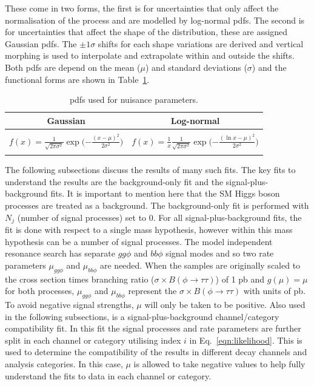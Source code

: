 These come in two forms, the first is for uncertainties that only affect the normalisation of the process and are modelled by log-normal pdfs. 
The second is for uncertainties that affect the shape of the distribution, these are assigned Gaussian pdfs.
The $\pm1\sigma$ shifts for each shape variations are derived and vertical morphing \cite{Conway:2011in} is used to interpolate and extrapolate within and outside the shifts.
Both pdfs are depend on the mean ($\mu$) and standard deviations ($\sigma$) and the functional forms are shown in Table~\ref{tab:pdfs}. \\

\begin{table}[!hbtp]
    \centering
    \begin{tabular}{|c|c|}
         \hline
         Gaussian & Log-normal  \\
         \hline
         \hline
          & \\
         $f(x) = \frac{1}{\sqrt{2\pi\sigma^{2}}} \exp\Big({-\frac{(x - \mu)^2}{2\sigma^2}}\Big)$ & $f(x) = \frac{1}{x} \frac{1}{\sqrt{2\pi\sigma^{2}}} \exp\Big({-\frac{(\ln x - \mu)^2}{2\sigma^2}}\Big)$ \\
          & \\
         \hline
    \end{tabular}
    \caption{pdfs used for nuisance parameters.}
    \label{tab:pdfs}
\end{table}

The following subsections discuss the results of many such fits.
The key fits to understand the results are the background-only fit and the signal-plus-background fits.
It is important to mention here that the SM Higgs boson processes are treated as a background.
The background-only fit is performed with $N_j$ (number of signal processes) set to 0.
For all signal-plus-background fits, the fit is done with respect to a single mass hypothesis, however within this mass hypothesis can be a number of signal processes.
The model independent resonance search has separate $gg\phi$ and $bb\phi$ signal modes and so two rate parameters $\mu_{gg\phi}$ and $\mu_{bb\phi}$ are needed.
When the samples are originally scaled to the cross section times branching ratio ($\sigma \times B (\phi\rightarrow\tau\tau)$) of 1 pb and $g(\mu)=\mu$ for both processes, $\mu_{gg\phi}$ and $\mu_{bb\phi}$ represent the $\sigma \times B (\phi\rightarrow\tau\tau)$ with units of pb.
To avoid negative signal strengths, $\mu$ will only be taken to be positive.
Also used in the following subsections, is a signal-plus-background channel/category compatibility fit.
In this fit the signal processes and rate parameters are further split in each channel or category utilising index $i$ in Eq.~\ref{eqn:likelihood}.
This is used to determine the compatibility of the results in different decay channels and analysis categories.
In this case, $\mu$ is allowed to take negative values to help fully understand the fits to data in each channel or category. \\

